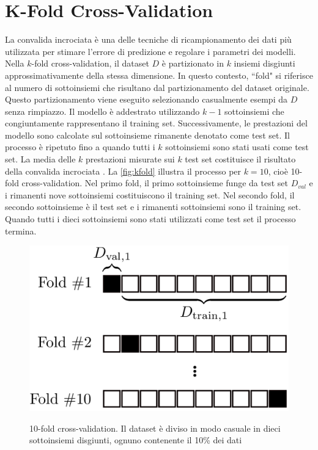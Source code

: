 \documentclass[12pt,italian]{report}
\begin{document}
\section{K-Fold Cross-Validation} \label{sec:k-fold}
La convalida incrociata è una delle tecniche di ricampionamento dei dati più utilizzata per stimare l'errore di predizione e regolare i parametri dei modelli. Nella $k$-fold cross-validation, il dataset $D$ è partizionato in $k$ insiemi disgiunti approssimativamente della stessa dimensione. In questo contesto, ``fold" si riferisce al numero di sottoinsiemi che risultano dal partizionamento del dataset originale. Questo partizionamento viene eseguito selezionando casualmente esempi da $D$ senza rimpiazzo. Il modello è addestrato utilizzando $k-1$ sottoinsiemi che congiuntamente rappresentano il training set. Successivamente, le prestazioni del modello sono calcolate sul sottoinsieme rimanente denotato come test set. Il processo è ripetuto fino a quando tutti i $k$ sottoinsiemi sono stati usati come test set. La media delle $k$ prestazioni misurate sui $k$ test set costituisce il risultato della convalida incrociata \cite{k-fold}. La \autoref{fig:kfold} illustra il processo per $k=10$, cioè 10-fold cross-validation. Nel primo fold, il primo sottoinsieme funge da test set $D_{val}$ e i rimanenti nove sottoinsiemi costituiscono il training set. Nel secondo fold, il secondo sottoinsieme è il test set e i rimanenti sottoinsiemi sono il training set. Quando tutti i dieci sottoinsiemi sono stati utilizzati come test set il processo termina.

\begin{figure}
  \centering
  \includegraphics[scale=0.40]{immagini/kfold.png}
  \caption{10-fold cross-validation. Il dataset è diviso in modo casuale in dieci sottoinsiemi disgiunti, ognuno contenente il 10\% dei dati}
  \cite{k-fold}
  \label{fig:kfold}
\end{figure}
\end{document}

